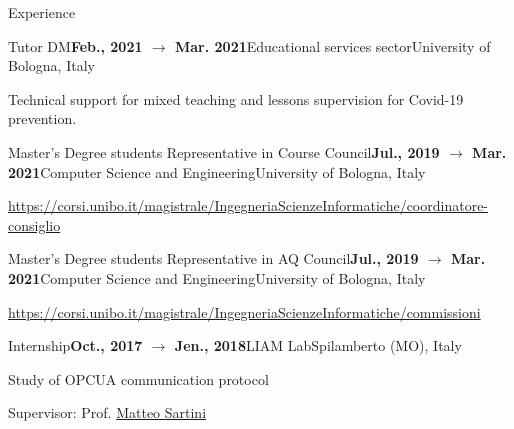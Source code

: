 \documentclass{resume} %
\begin{document}
\begin{rSection}{Experience}
        \begin{rSubsection}{Tutor DM}{\textbf{Feb., 2021 $\rightarrow$ Mar. 2021}}{Educational services sector}{University of Bologna, Italy}
            \item Technical support for mixed teaching and lessons supervision for Covid-19 prevention.
        \end{rSubsection}
        
        \begin{rSubsection}{Master's Degree students Representative in Course Council}{\textbf{Jul., 2019 $\rightarrow$ Mar. 2021}}{Computer Science and Engineering}{University of Bologna, Italy}
            \item \url{https://corsi.unibo.it/magistrale/IngegneriaScienzeInformatiche/coordinatore-consiglio}
        \end{rSubsection}
        
        \begin{rSubsection}{Master's Degree students Representative in AQ Council}{\textbf{Jul., 2019 $\rightarrow$ Mar. 2021}}{Computer Science and Engineering}{University of Bologna, Italy}
            \item \url{https://corsi.unibo.it/magistrale/IngegneriaScienzeInformatiche/commissioni}
        \end{rSubsection}
        
        \begin{rSubsection}{Internship}{\textbf{Oct., 2017 $\rightarrow$ Jen., 2018}}{LIAM Lab}{Spilamberto (MO), Italy}
            \item Study of OPCUA communication protocol
            \item Supervisor: Prof. \href{mailto:matteo.sartini@unibo.it}{Matteo Sartini} 
        \end{rSubsection}
        
    \end{rSection}
    
\end{document}
